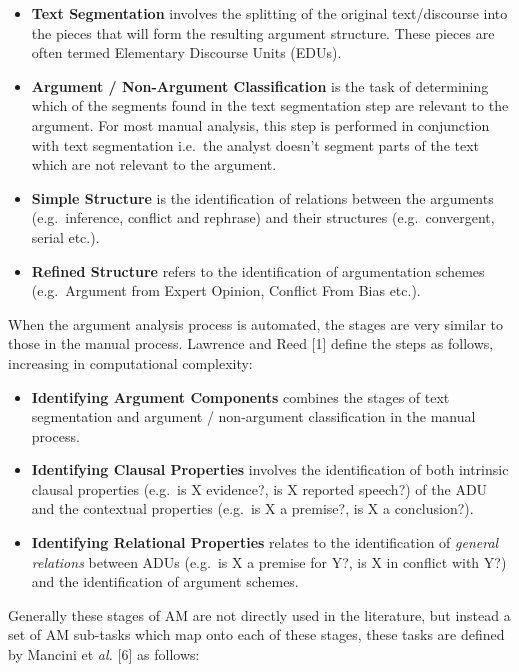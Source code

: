 \documentclass[twocolumn,twoside]{article}
\providecommand{\tightlist}{%
  \setlength{\itemsep}{0pt}\setlength{\parskip}{0pt}}
\begin{document}
\begin{itemize}
\tightlist
\item
  \textbf{Text Segmentation} involves the splitting of the original
  text/discourse into the pieces that will form the resulting argument
  structure. These pieces are often termed Elementary Discourse Units
  (EDUs).
\item
  \textbf{Argument / Non-Argument Classification} is the task of
  determining which of the segments found in the text segmentation step
  are relevant to the argument. For most manual analysis, this step is
  performed in conjunction with text segmentation i.e.~the analyst
  doesn't segment parts of the text which are not relevant to the
  argument.
\item
  \textbf{Simple Structure} is the identification of relations between
  the arguments (e.g.~inference, conflict and rephrase) and their
  structures (e.g.~convergent, serial etc.).
\item
  \textbf{Refined Structure} refers to the identification of
  argumentation schemes (e.g.~Argument from Expert Opinion, Conflict
  From Bias etc.).
\end{itemize}

When the argument analysis process is automated, the stages are very
similar to those in the manual process. Lawrence and Reed {[}1{]} define
the steps as follows, increasing in computational complexity:

\begin{itemize}
\tightlist
\item
  \textbf{Identifying Argument Components} combines the stages of text
  segmentation and argument / non-argument classification in the manual
  process.
\item
  \textbf{Identifying Clausal Properties} involves the identification of
  both intrinsic clausal properties (e.g.~is X evidence?, is X reported
  speech?) of the ADU and the contextual properties (e.g.~is X a
  premise?, is X a conclusion?).
\item
  \textbf{Identifying Relational Properties} relates to the
  identification of \emph{general relations} between ADUs (e.g.~is X a
  premise for Y?, is X in conflict with Y?) and the identification of
  argument schemes.
\end{itemize}

Generally these stages of AM are not directly used in the literature,
but instead a set of AM sub-tasks which map onto each of these stages,
these tasks are defined by Mancini et \emph{al.} {[}6{]} as follows:
\end{document}
